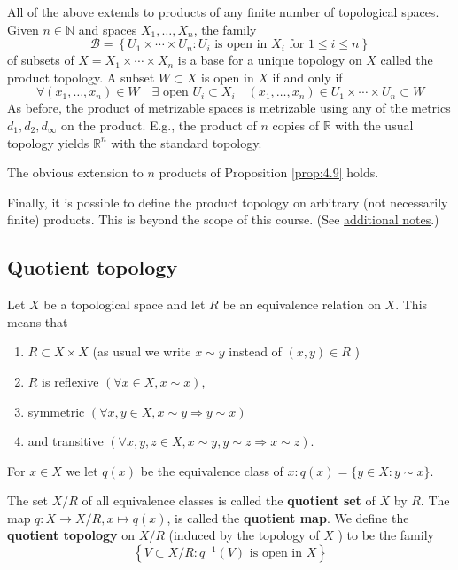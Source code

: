\documentclass[a4paper,11pt]{article}
\begin{document}
\begin{remark}
    All of the above extends to products of any finite number of topological spaces. Given $n \in \mathbb{N}$ and spaces $X_{1}, \ldots, X_{n}$, the family
    $$
    \mathcal{B}=\left\{U_{1} \times \cdots \times U_{n}: U_{i} \text { is open in } X_{i} \text { for } 1 \leqslant i \leqslant n\right\}
    $$
    of subsets of $X=X_{1} \times \cdots \times X_{n}$ is a base for a unique topology on $X$ called the product topology. A subset $W \subset X$ is open in $X$ if and only if
    $$
    \forall\left(x_{1}, \ldots, x_{n}\right) \in W \quad \exists \text { open } U_{i} \subset X_{i} \quad\left(x_{1}, \ldots, x_{n}\right) \in U_{1} \times \cdots \times U_{n} \subset W
    $$
    As before, the product of metrizable spaces is metrizable using any of the metrics $d_{1}, d_{2}, d_{\infty}$ on the product. E.g., the product of $n$ copies of $\mathbb{R}$ with the usual topology yields $\mathbb{R}^{n}$ with the standard topology.

    The obvious extension to $n$ products of Proposition \ref{prop:4.9} holds.

    Finally, it is possible to define the product topology on arbitrary (not necessarily finite) products. This is beyond the scope of this course. (See \href{https://www.dpmms.cam.ac.uk/~az10000/2021-mich-partib-aandt-product-topology.pdf}{additional notes}.)
\end{remark}

\subsection{Quotient topology}
Let $X$ be a topological space and let $R$ be an equivalence relation on $X$. This means that 
\begin{enumerate}
    \item $R \subset X \times X$ (as usual we write $x \sim y$ instead of $(x, y) \in R$ )
    \item $R$ is reflexive $(\forall x \in X, x \sim x)$,
    \item symmetric $(\forall x, y \in X, x \sim y \Rightarrow y \sim x)$ 
    \item and transitive $(\forall x, y, z \in X, x \sim y, y \sim z \Rightarrow x \sim z)$.
\end{enumerate}
For $x \in X$ we let $q(x)$ be the equivalence class of $x: q(x)=\{y \in X: y \sim x\}$.

\begin{definition}
    The set $X / R$ of all equivalence classes is called the \textbf{quotient set} of $X$ by $R$. The map $q: X \rightarrow X / R, x \mapsto q(x)$, is called the \textbf{quotient map}. We define the \textbf{quotient topology} on $X / R$ (induced by the topology of $X$ ) to be the family
    $$
    \left\{V \subset X / R: q^{-1}(V) \text { is open in } X\right\}
    $$
\end{definition}
\end{document}
